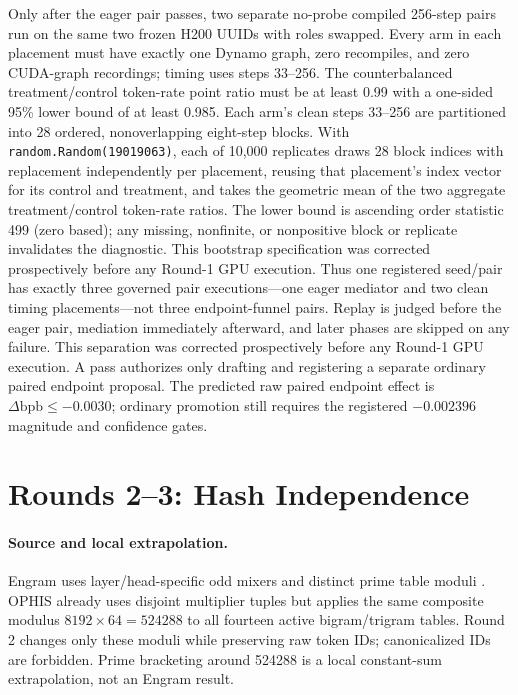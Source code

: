\documentclass{article}
\newcommand{\bpb}{\mathrm{bpb}}
\begin{document}
Only after the eager pair passes, two separate no-probe compiled 256-step
pairs run on the same two frozen H200 UUIDs with roles swapped.  Every arm in
each placement must have exactly one Dynamo graph, zero recompiles, and zero
CUDA-graph recordings; timing uses steps 33--256.  The counterbalanced
treatment/control token-rate point ratio must be at least 0.99 with a
one-sided 95\% lower bound of at least 0.985.  Each arm's clean steps 33--256
are partitioned into 28 ordered, nonoverlapping eight-step blocks.  With
\texttt{random.Random(19019063)}, each of 10,000 replicates draws 28 block
indices with replacement independently per placement, reusing that placement's
index vector for its control and treatment, and takes the geometric mean of
the two aggregate treatment/control token-rate ratios.  The lower bound is
ascending order statistic 499 (zero based); any missing, nonfinite, or
nonpositive block or replicate invalidates the diagnostic.  This bootstrap
specification was corrected prospectively before any Round-1 GPU execution.
Thus one registered seed/pair
has exactly three governed pair executions---one eager mediator and two clean
timing placements---not three endpoint-funnel pairs.  Replay is judged before
the eager pair, mediation immediately afterward, and later phases are skipped
on any failure.  This separation was corrected prospectively before any
Round-1 GPU execution.  A pass authorizes only drafting and registering a
separate ordinary paired endpoint proposal.  The predicted raw paired endpoint effect is
$\Delta\bpb\le-0.0030$; ordinary promotion still requires the registered
$-0.002396$ magnitude and confidence gates.

\section{Rounds 2--3: Hash Independence}

\paragraph{Source and local extrapolation.}
Engram uses layer/head-specific odd mixers and distinct prime table moduli
\cite{engram2026,engramcode}.  OPHIS already uses disjoint multiplier tuples
but applies the same composite modulus
$8192\times64=524288$ to all fourteen active bigram/trigram tables.
Round 2 changes only these moduli while preserving raw token IDs;
canonicalized IDs are forbidden.  Prime bracketing around 524288 is a local
constant-sum extrapolation, not an Engram result.
\end{document}
